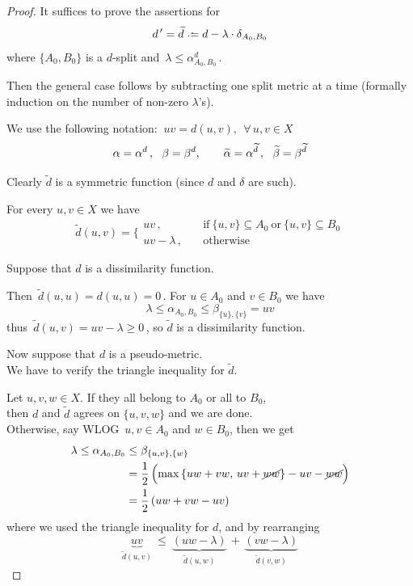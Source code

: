 \documentclass[./main.tex]{subfiles}
\begin{document}
\begin{proof}
    It suffices to prove the assertions for
    \[ \dpr = \widetilde{d} \defeq d - \lambda \cdot \delta_{A_0,B_0} \]
    where $\{A_0,B_0\}$ is a $d$-split and $\, \lambda \leq \alpha_{A_0,B_0}^d \,$.

    Then the general case follows by subtracting one split metric at a time (formally induction on the number of non-zero $\lambda$’s). \bigskip

    We use the following notation: $\ uv = d(u,v),\ \ \forall\, u,v \in X$
    \[ \alpha = \alpha^d \,,\ \ \beta = \beta^d, \qquad \widetilde{\alpha} = \alpha^{\widetilde{d}} \,,\ \ \widetilde{\beta} = \beta^{\widetilde{d}} \nospblw \] \bigskip

    Clearly $\widetilde{d}$ is a symmetric function (since $d$ and $\delta$ are such).

    For every $u,v \in X$ we have
    \[ \widetilde{d}(u,v) = \bigg\{
        \begin{array}{cl}
            uv \,,              & \quad \text{if}\ \{u,v\} \subseteq A_0\ \text{or}\ \{u,v\} \subseteq B_0 \\
            uv - \lambda \,,    & \quad \text{otherwise}
        \end{array} 
    \] \bigskip

    Suppose that $d$ is a dissimilarity function.

    Then $\, \widetilde{d}(u,u) = d(u,u) = 0 \,$. For $u \in A_0$ and $v \in B_0$ we have
    \[ \lambda \leq \alpha_{A_0,B_0} \leq \beta_{\{u\},\{v\}} = uv \]
    thus $\, \widetilde{d}(u,v) = uv - \lambda \geq 0 \,$, so $\widetilde{d}$ is a dissimilarity function. \bigskip

    Now suppose that $d$ is a pseudo-metric. \\
    We have to verify the triangle inequality for $\widetilde{d}$.
    
    Let $u,v,w \in X$. If they all belong to $A_0$ or all to $B_0$, \\
    \bsp then $d$ and $\widetilde{d}$ agrees on $\{u,v,w\}$ and we are done. \\[2pt]
    Otherwise, say WLOG $\, u,v \in A_0$ and $w \in B_0$, then we get
    \begin{align*}
        \lambda \leq \alpha_{A_0,B_0} &\leq \beta_{\{u,v\},\{w\}} \\
        &= \frac{1}{2}\, \Bigl( \max {\{ uw + vw,\, uv + \cancel{ww} \}} - uv - \cancel{ww} \Bigr) \\
        &= \frac{1}{2}\, (uw + vw - uv)
    \end{align*}
    where we used the triangle inequality for $d$, and by rearranging
    \[ \underbrace{uv}_{\widetilde{d}(u,v)}\ \leq\ \underbrace{(uw - \lambda)}_{\widetilde{d}(u,w)} \,+\, \underbrace{(vw - \lambda)}_{\widetilde{d}(v,w)} \]


\end{proof}
\end{document}
